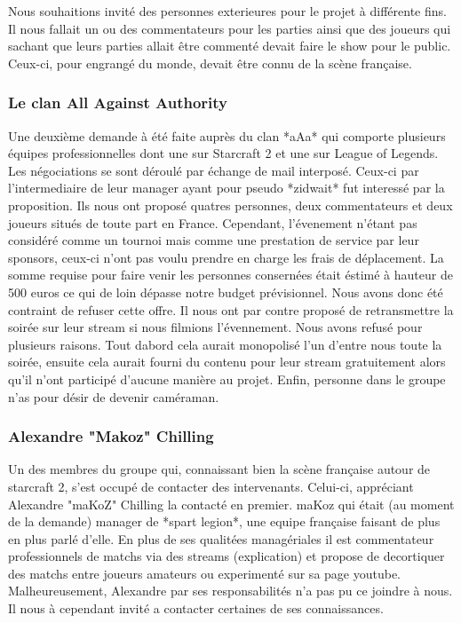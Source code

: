Nous souhaitions invité des personnes exterieures pour le projet à
différente fins. Il nous fallait un ou des commentateurs pour les
parties ainsi que des joueurs qui sachant que leurs parties allait être
commenté devait faire le show pour le public. Ceux-ci, pour engrangé du
monde, devait être connu de la scène française.

\subsubsection{Le clan All Against Authority}%
\label{ssub:le_clan_all_against_authority}

Une deuxième demande à été faite auprès du clan *aAa* qui comporte
plusieurs équipes professionnelles dont une sur Starcraft 2 et une sur
League of Legends. Les négociations se sont déroulé par échange de mail
interposé.  Ceux-ci par l'intermediaire de leur manager ayant pour
pseudo *zidwait* fut interessé par la proposition. Ils nous ont proposé
quatres personnes, deux commentateurs et deux joueurs situés de toute
part en France. Cependant, l'évenement n'étant pas considéré comme un
tournoi mais comme une prestation de service par leur sponsors, ceux-ci
n'ont pas voulu prendre en charge les frais de déplacement. La somme
requise pour faire venir les personnes consernées était éstimé à hauteur
de 500 euros ce qui de loin dépasse notre budget prévisionnel. Nous
avons donc été contraint de refuser cette offre. Il nous ont par contre
proposé de retransmettre la soirée sur leur stream si nous filmions
l'évennement. Nous avons refusé pour plusieurs raisons. Tout dabord cela
aurait monopolisé l'un d'entre nous toute la soirée, ensuite cela aurait
fourni du contenu pour leur stream gratuitement alors qu'il n'ont
participé d'aucune manière au projet. Enfin, personne dans le groupe
n'as pour désir de devenir caméraman.

\subsubsection{Alexandre "Makoz" Chilling}%
\label{ssub:alexandre_makoz_chilling}

Un des membres du groupe qui, connaissant bien la scène française autour
de starcraft 2, s'est occupé de contacter des intervenants.  Celui-ci,
appréciant Alexandre "maKoZ" Chilling la contacté en premier.  maKoz qui
était (au moment de la demande) manager de *spart legion*, une equipe
française faisant de plus en plus parlé d'elle. En plus de ses qualitées
managériales il est commentateur professionnels de matchs via des
streams (explication) et propose de decortiquer des matchs entre joueurs
amateurs ou experimenté sur sa page youtube. Malheureusement, Alexandre
par ses responsabilités n'a pas pu ce joindre à nous. Il nous à
cependant invité a contacter certaines de ses connaissances.

